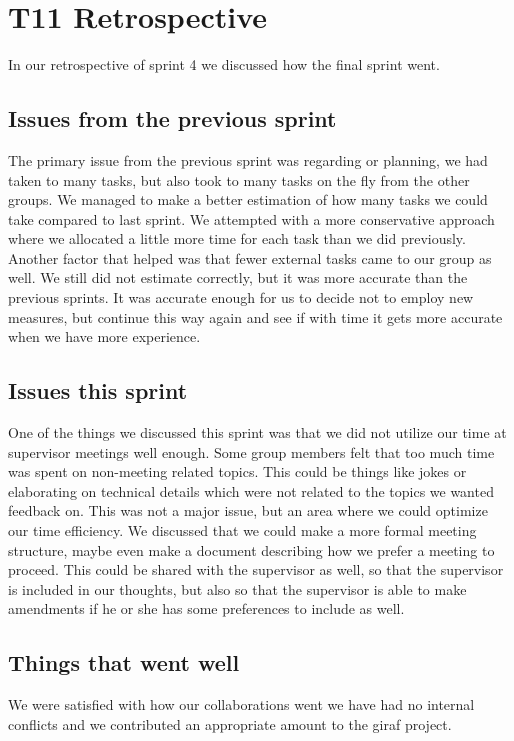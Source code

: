 \section{\gls{T11} Retrospective}

In our retrospective of sprint 4 we discussed how the final sprint went.

\subsection{Issues from the previous sprint}
The primary issue from the previous sprint was regarding or planning, we had taken to many tasks, but also took to many tasks on the fly from the other groups.
We managed to make a better estimation of how many tasks we could take compared to last sprint. We attempted with a more conservative approach where we allocated a little more time for each task than we did previously. Another factor that helped was that fewer external tasks came to our group as well. We still did not estimate correctly, but it was more accurate than the previous sprints. It was accurate enough for us to decide not to employ new measures, but continue this way again and see if with time it gets more accurate when we have more experience.

\subsection{Issues this sprint}
One of the things we discussed this sprint was that we did not utilize our time at supervisor meetings well enough. Some group members felt that too much time was spent on non-meeting related topics. This could be things like jokes or elaborating on technical details which were not related to the topics we wanted feedback on. This was not a major issue, but an area where we could optimize our time efficiency.
We discussed that we could make a more formal meeting structure, maybe even make a document describing how we prefer a meeting to proceed. This could be shared with the supervisor as well, so that the supervisor is included in our thoughts, but also so that the supervisor is able to make amendments if he or she has some preferences to include as well.

\subsection{Things that went well}
We were satisfied with how our collaborations went we have had no internal conflicts and we contributed an appropriate amount to the \gls{giraf} project. 
